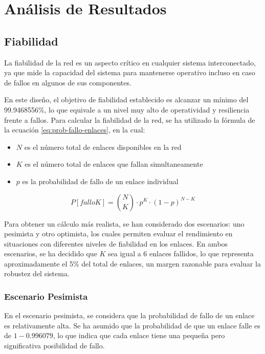 \documentclass[%
    school=etsisi,%
    degree=61TI,%
]{upm-report}
\begin{document}
\chapter{Análisis de Resultados}
\label{ch:análisis-resultados}

\section{Fiabilidad}
\label{sec:fiabilidad}

La fiabilidad de la red es un aspecto crítico en cualquier sistema interconectado, ya que mide la capacidad del sistema para mantenerse operativo incluso en caso de fallos en algunos de sus componentes.

En este diseño, el objetivo de fiabilidad establecido es alcanzar un mínimo del 99.9468556\%, lo que equivale a un nivel muy alto de operatividad y resiliencia frente a fallos. Para calcular la fiabilidad de la red, se ha utilizado la fórmula de la ecuación \ref{eq:prob-fallo-enlaces}, en la cual:

\begin{itemize}
    \item $N$ es el número total de enlaces disponibles en la red
    \item $K$ es el número total de enlaces que fallan simultaneamente
    \item $p$ es la probabilidad de fallo de un enlace individual
\end{itemize}

\begin{equation} \label{eq:prob-fallo-enlaces}
    P[fallo K] = {N \choose K} \cdot p^K \cdot (1 - p)^{N - K}
\end{equation}

Para obtener un cálculo más realista, se han considerado dos escenarios: uno pesimista y otro optimista, los cuales permiten evaluar el rendimiento en situaciones con diferentes niveles de fiabilidad en los enlaces. En ambos escenarios, se ha decidido que $K$ sea igual a 6 enlaces fallidos, lo que representa aproximadamente el 5\% del total de enlaces, un margen razonable para evaluar la robustez del sistema.

\subsection{Escenario Pesimista}
\label{subsec:escenario-pesimista}

En el escenario pesimista, se considera que la probabilidad de fallo de un enlace es relativamente alta. Se ha asumido que la probabilidad de que un enlace falle es de $1 - 0.996079$, lo que indica que cada enlace tiene una pequeña pero significativa posibilidad de fallo.
\end{document}
